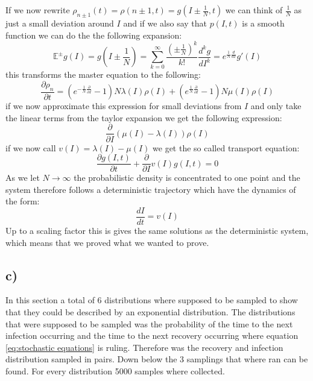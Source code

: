 \documentclass[15pt]{article}
\begin{document}
If we now rewrite $\rho_{n \pm1}(t) = \rho(n \pm 1, t) =g(I \pm \frac{1}{N}, t)$ we can think of $\frac{1}{N}$ as just a small deviation around $I$ and if we also say that $p(I, t)$ is a smooth function we can do the the following expansion:
\begin{equation}
	\mathbb{E^\pm}g(I) = g(I \pm \frac{1}{N}) = \sum_{k=0}^{\infty} \frac{(\pm\frac{1}{N})^k}{k!} \frac{d^kg}{dI^k} = e^{\frac{1}{N}\frac{d}{dI}} g \prime (I)
\end{equation}
this transforms the master equation to the following:
\begin{equation}
	\frac{\partial\rho_n}{\partial t} = \left(e^{-\frac{1}{N}\frac{\partial}{\partial I} }-1 \right) N\lambda(I)\rho(I)+\left(e^{\frac{1}{N}\frac{\partial}{\partial I}} -1 \right) N\mu(I)\rho(I)
\end{equation}
if we now approximate this expression for small deviations from $I$ and only take the linear terms from the taylor expansion we get the following expression:
\begin{equation}
	\frac{\partial}{\partial I}(\mu(I) - \lambda(I))\rho(I)
\end{equation}
if we now call $v(I) = \lambda(I) - \mu(I)$ we get the so called transport equation:
\begin{equation}
	\frac{\partial g(I,t)}{\partial t} + \frac{\partial }{\partial I}v(I)g(I,t) = 0
\end{equation}
As we let $N \rightarrow \infty$ the probabilistic density is concentrated to one point and the system therefore follows a deterministic trajectory which have the dynamics of the form:
\begin{equation}
	\frac{dI}{dt} = v(I)
\end{equation}
Up to a scaling factor this is gives the same solutions as the deterministic system, which means that we proved what we wanted to prove.
\subsection{c)}
In this section a total of 6 distributions where supposed to be sampled to show that they could be described by an exponential distribution. The distributions that were supposed to be sampled was the probability of the time to the next infection occurring and the time to the next recovery occurring where equation \ref{eq:stochastic equations} is ruling. Therefore was the recovery and infection distribution sampled in pairs. Down below the 3 samplings that where ran can be found. For every distribution 5000 samples where collected.
\end{document}
